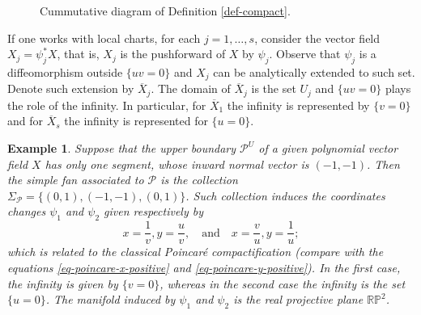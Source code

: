 \documentclass[12pt]{amsart}
\newtheorem{example}[theorem]{Example}
\begin{document}
\begin{figure}[h!]
\begin{flushright}
\begin{center}
\end{center}
\end{flushright}
\caption{\footnotesize{Cummutative diagram of Definition \ref{def-compact}.}}
\label{fig-diag-def-compact}
\end{figure}

If one works with local charts, for each $j = 1,\dots,s$, consider the vector field $X_{j} = \psi_{j}^{*} X$, that is, $X_{j}$ is the pushforward of $X$ by $\psi_{j}$. Observe that $\psi_{j}$ is a diffeomorphism outside $\{uv = 0\}$ and $X_{j}$ can be analytically extended to such set. Denote such extension by $\overline{X}_{j}$. The domain of $\overline{X}_{j}$ is the set $U_{j}$ and $\{uv = 0\}$ plays the role of the infinity. In particular, for $\overline{X}_{1}$ the infinity is represented by $\{v = 0\}$ and for $\overline{X}_{s}$ the infinity is represented for $\{u = 0\}$.

\begin{example}
Suppose that the upper boundary $\mathcal{P}^{U}$ of a given polynomial vector field $X$ has only one segment, whose inward normal vector is $(-1,-1)$. Then the simple fan associated to $\mathcal{P}$ is the collection $\Sigma_{\mathcal{P}} = \{(0,1),(-1,-1), (0,1)\}$. Such collection induces the coordinates changes $\psi_{1}$ and $\psi_{2}$ given respectively by
$$x = \frac{1}{v}, y = \frac{u}{v}, \quad \text{and} \quad x = \frac{v}{u}, y = \frac{1}{u};$$
which is related to the classical Poincaré compactification (compare with the equations \eqref{eq-poincare-x-positive} and \eqref{eq-poincare-y-positive}). In the first case, the infinity is given by $\{v = 0\}$, whereas in the second case the infinity is the set $\{u = 0\}$. The manifold induced by $\psi_{1}$ and $\psi_{2}$ is the real projective plane $\mathbb{RP}^{2}$.
\end{example}
\end{document}
